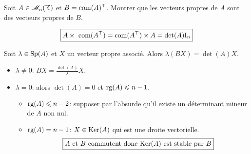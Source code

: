 \begin{exercice}
    Soit $A \in \mathscr{M}_n(\mathbb{K})$ et $B = \mathrm{com}(A)^\top$. Montrer que les vecteurs propres de $A$ sont des vecteurs propres de $B$. 
\end{exercice}

$$\boxed{A \times\ \mathrm{com}(A^\top) = \mathrm{com}(A^\top) \times A = \det(A) \mathrm{I}_n}$$

\begin{elem_sol}
    Soit $\lambda \in \mathrm{Sp}(A)$ et $X$ un vecteur propre associé. Alors $\lambda (BX) = \det(A) X$. 
        
    \begin{itemize}
        \item $\lambda \not = 0$: $BX = \frac{\det(A)}{\lambda}X$. 
        \item $\lambda = 0$: alors $\det(A) = 0$ et $\mathrm{rg}(A) \leqslant n-1$. 
        \begin{itemize}
            \item $\mathrm{rg}(A) \leqslant n-2$: supposer par l'absurde qu'il existe un déterminant mineur de $A$ non nul. 
            \item $\mathrm{rg}(A) = n-1$: $X \in \mathrm{Ker}(A)$ qui est une droite vectorielle. 
            $$\boxed{A \text{ et } B \text{ commutent donc } \mathrm{Ker}(A) \text{ est stable par } B}$$
        \end{itemize}
    \end{itemize}
\end{elem_sol}
